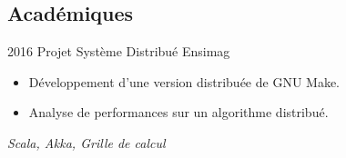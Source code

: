 \documentclass[11pt,a4paper,sans]{moderncv} %
\begin{document}
\subsection{Académiques}

\cventry
    {2016}
    {Projet Système Distribué}
    {}
    {Ensimag}
    {}
    {
        \begin{itemize}
            \item Développement d'une version distribuée de GNU Make.
            \item Analyse de performances sur un algorithme distribué.
        \end{itemize}
        \vspace*{1mm}
        \textit{Scala, Akka, Grille de calcul}
    }





\end{document}
